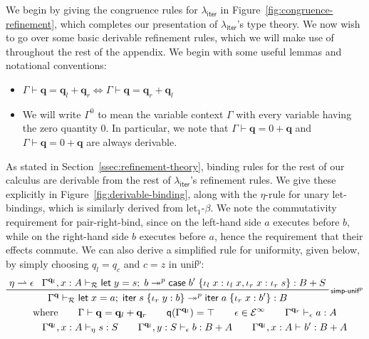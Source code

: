 \documentclass[acmsmall,screen,review]{acmart}
\newcommand{\mc}[1]{\ensuremath{\mathcal{#1}}}
\newcommand{\mb}[1]{\ensuremath{\mathbf{#1}}}
\newcommand{\ms}[1]{\ensuremath{\mathsf{#1}}}
\newcommand{\lto}{:}
\newcommand{\linl}[1]{\iota_l\;{#1}}
\newcommand{\linr}[1]{\iota_r\;{#1}}
\newcommand{\letexpr}[3]{\ensuremath{\ms{let}\;#1 = #2;\;#3}}
\newcommand{\caseexpr}[5]{\ms{case}\;#1\;\{\linl{#2} \lto #3, \linr{#4} \lto #5\}}
\newcommand{\liter}[3]{\ms{iter}\;#1\;\{ \linr{#2} \lto #3 \}}
\newcommand{\einf}[1]{#1 \in \mc{E}^\infty}
\newcommand{\qsp}[4]{#1 \vdash #2 = #3 + #4}
\newcommand{\rle}[1]{{\scriptsize\textsf{#1}}}
\newcommand{\hasty}[4]{#1 \vdash_{#2} #3: {#4}}
\newcommand{\tref}{\twoheadrightarrow}
\newcommand{\tmlep}[6]{#1 \vdash_{#2} #3 \tref^{#6} #4 : {#5}}
\newcommand{\brle}[1]{{\textsf{#1}}}
\newcommand{\subiterexp}{\texorpdfstring{\(\lambda_{\ms{iter}}\)}{lambda-iter}}
\newcommand{\rightmove}{\rightharpoonup}
\newcommand{\zeroq}{0}
\newcommand{\alquant}{\ms{q}}
\begin{document}
We begin by giving the congruence rules for \subiterexp{} in Figure~\ref{fig:congruence-refinement},
which completes our presentation of \subiterexp{}'s type theory. We now wish to go over some basic
derivable refinement rules, which we will make use of throughout the rest of the appendix. We begin
with some useful lemmas and notational conventions:
\begin{itemize}
  \item $\qsp{\Gamma}{\mb{q}}{\mb{q}_l}{\mb{q}_r} \iff \qsp{\Gamma}{\mb{q}}{\mb{q}_r}{\mb{q}_l}$
  \item We will write $\Gamma^\zeroq$ to mean the variable context $\Gamma$ with every variable
  having the zero quantity $\zeroq$. In particular, we note that $\qsp{\Gamma}{\mb{q}}{0}{\mb{q}}$
  and $\qsp{\Gamma}{\mb{q}}{0}{\mb{q}}$ are always derivable.
\end{itemize}
As stated in Section~\ref{ssec:refinement-theory}, binding rules for the rest of our calculus are
derivable from the rest of \subiterexp{}'s refinement rules. We give these explicitly in
Figure~\ref{fig:derivable-binding}, along with the $\eta$-rule for unary let-bindings, which is
similarly derived from \brle{let$_1$-$\beta$}. We note the commutativity requirement for
\brle{pair-right-bind}, since on the left-hand side $a$ executes before $b$, while on the right-hand
side $b$ executes before $a$, hence the requirement that their effects commute. We can also derive a
simplified rule for uniformity, given below, by simply choosing $q_l = q_c$ and $c = z$ in
\brle{unif$^p$}:
  \begin{gather*}
    \prftree[r]{\rle{simp-unif$^p$}}
      {\eta \rightmove \epsilon}
      {\tmlep{\Gamma^{\mb{q}_l}, x : A}{\mc{R}}
        {\letexpr{y}{s}{b}}
        {\caseexpr{b'}{x}{\linl{x}}{x}{\linr{s}}}{B + S}{p}}
      {
        \tmlep{\Gamma^{\mb{q}}}
          {\mc{R}}
          {\letexpr{x}{a}{\liter{s}{y}{b}}}
          {\liter{a}{x}{b'}}
          {B}
          {p}
      } \\
    \text{where} \qquad {\qsp{\Gamma}{\mb{q}}{\mb{q}_l}{\mb{q}_r}} \qquad
    \alquant(\Gamma^{\mb{q}_l}) = \top \qquad
    \einf{\epsilon} \qquad {\hasty{\Gamma^{\mb{q}_r}}{\epsilon}{a}{A}}
    \\
    \qquad {\hasty{\Gamma^{\mb{q}_l}, x : A}{\eta}{s}{S}}
    \qquad {\hasty{\Gamma^{\mb{q}_l}, y : S}{\epsilon}{b}{B + A}}
    \qquad {\hasty{\Gamma^{\mb{q}_l}, x : A}{}{b'}{B + A}}
  \end{gather*}
\end{document}

